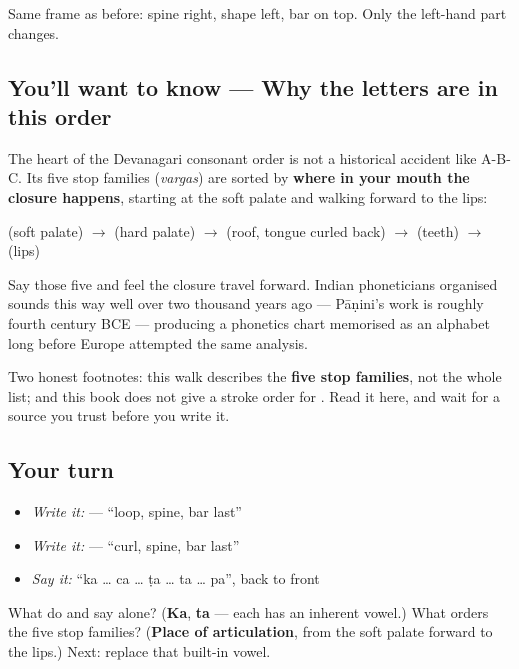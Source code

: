 Same frame as before: spine right, shape left, bar on top. Only the left-hand part changes.

\subsection*{You'll want to know — Why the letters are in this order}
The heart of the Devanagari consonant order is not a historical accident like A-B-C. Its five stop families (\emph{vargas}) are sorted by \textbf{where in your mouth the closure happens}, starting at the soft palate and walking forward to the lips:

\textbf{} (soft palate) $\to$ \textbf{} (hard palate) $\to$ \textbf{} (roof, tongue curled back) $\to$ \textbf{} (teeth) $\to$ \textbf{} (lips)

Say those five and feel the closure travel forward. Indian phoneticians organised sounds this way well over two thousand years ago — Pāṇini's work is roughly fourth century BCE — producing a phonetics chart memorised as an alphabet long before Europe attempted the same analysis.

Two honest footnotes: this walk describes the \textbf{five stop families}, not the whole list; and this book does not give a stroke order for \textbf{}. Read it here, and wait for a source you trust before you write it.

\subsection*{Your turn}
\begin{itemize}
\raggedright
  \item \emph{Write it:}  — \textquotedblleft{}loop, spine, bar last\textquotedblright{}
  \item \emph{Write it:}  — \textquotedblleft{}curl, spine, bar last\textquotedblright{}
  \item \emph{Say it:} \textquotedblleft{}ka … ca … ṭa … ta … pa\textquotedblright{}, back to front
\end{itemize}

\begin{tcolorbox}[breakable,colback=teal!4,colframe=teal!35!black,title={Before you move on}]
What do \textbf{} and \textbf{} say alone? (\textbf{Ka}, \textbf{ta} — each has an inherent vowel.) What orders the five stop families? (\textbf{Place of articulation}, from the soft palate forward to the lips.) Next: replace that built-in vowel.
\end{tcolorbox}
